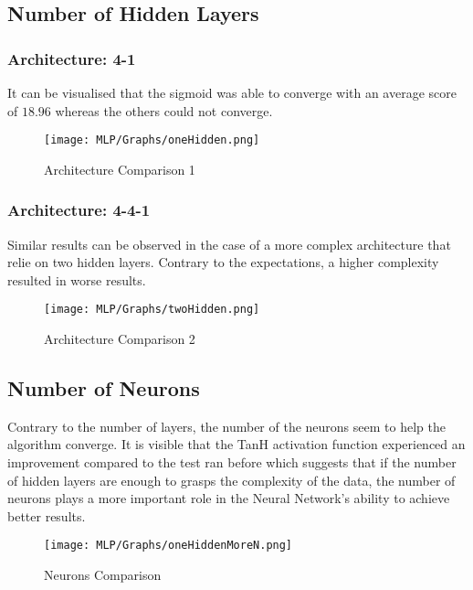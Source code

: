 \documentclass{report}
\begin{document}
\newpage
\subsection{Number of Hidden Layers}

\subsubsection{Architecture: 4-1}
It can be visualised that the sigmoid was able to converge with an average score of $18.96$ whereas the others could not converge.
\begin{center}
\begin{figure}[htp]
\texttt{[image: MLP/Graphs/oneHidden.png]}
\caption{Architecture Comparison 1}
\label{a41}
\end{figure}
\end{center}

\newpage
\subsubsection{Architecture: 4-4-1}
Similar results can be observed in the case of a more complex architecture that relie on two hidden layers. Contrary to the expectations, a higher complexity resulted in worse results.

\begin{center}
\begin{figure}[htp]
\texttt{[image: MLP/Graphs/twoHidden.png]}
\caption{Architecture Comparison 2}
\label{a42}
\end{figure}
\end{center}

\newpage
\subsection{Number of Neurons}
Contrary to the number of layers, the number of the neurons seem to help the algorithm converge. It is visible that the TanH activation function experienced an improvement compared to the test ran before which suggests that if the number of hidden layers are enough to grasps the complexity of the data, the number of neurons plays a more important role in the Neural Network's ability to achieve better results.

\begin{center}
\begin{figure}[htp]
\texttt{[image: MLP/Graphs/oneHiddenMoreN.png]}
\caption{Neurons Comparison}
\label{n1}
\end{figure}
\end{center}
\end{document}

